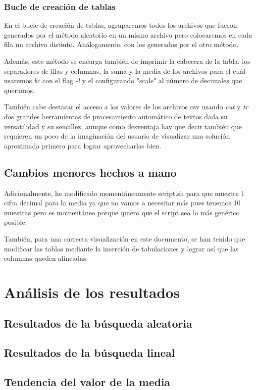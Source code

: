 \documentclass[a4paper, 11pt]{article}
\begin{document}
		\subsubsection{Bucle de creación de tablas}
			En el bucle de creación de tablas, agruparemos todos los archivos que fueron generados por el método aleatorio en
			un mismo archivo pero colocaremos en cada fila un archivo distinto. Análogamente, con los generados por el otro
			método.
			
			Además, este método se encarga también de imprimir la cabecera de la tabla, los separadores de filas y columnas,
			la suma y la media de los archivos para el cuál usaremos \textit{bc} con el flag \textit{-l} y el configurando
			"scale" al número de decimales que queramos.
			
			También cabe destacar el acceso a los valores de los archivos csv usando \textit{cut} y \textit{tr} dos grandes
			herramientas de procesamiento automático de textos dada su versatilidad y su sencillez, aunque como desventaja
			hay que decir también que requieren un poco de la imaginación del usuario de visualizar una solución aproximada
			primero para lograr aprovecharlas bien.

	\subsection{Cambios menores hechos a mano}
		Adicionalmente, he modificado momentáneamente script.sh para que muestre 1 cifra decimal para la media ya que no vamos a
		necesitar más pues tenemos 10 muestras pero es momentáneo porque quiero que el script sea lo más genérico posible.

		También, para una correcta visualización en este documento, se han tenido que modificar las tablas mediante la inserción
		de tabulaciones y lograr así que las columnas queden alineadas.
	

\section{Análisis de los resultados}
	\subsection{Resultados de la búsqueda aleatoria}
	\subsection{Resultados de la búsqueda lineal}
	\subsection{Tendencia del valor de la media}
\end{document}

